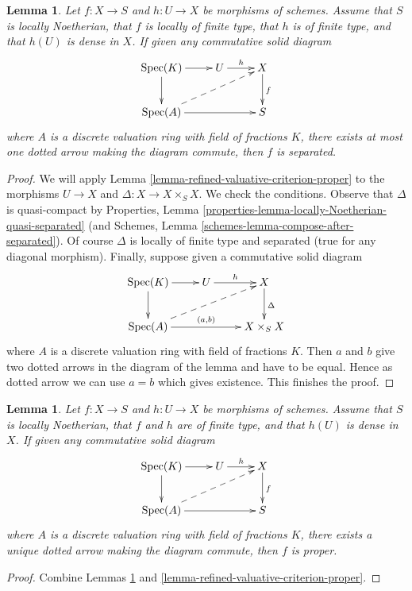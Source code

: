 \documentclass{stacks-project}
\theoremstyle{plain}
\newtheorem{lemma}[subsection]{Lemma}
\theoremstyle{definition}
\theoremstyle{remark}
\numberwithin{equation}{subsection}
\def\Spec{\mathop{\mathrm{Spec}}}
\begin{document}
\begin{lemma}
\label{lemma-refined-valuative-criterion-separated}
Let $f : X \to S$ and $h : U \to X$ be morphisms of schemes.
Assume that $S$ is locally Noetherian, that $f$ is locally of finite type,
that $h$ is of finite type, and that $h(U)$ is dense in $X$.
If given any commutative solid diagram
$$
\xymatrix{
\Spec(K) \ar[r] \ar[d] & U \ar[r]^h & X \ar[d]^f \\
\Spec(A) \ar[rr] \ar@{-->}[rru] & & S
}
$$
where $A$ is a discrete valuation ring with field of fractions $K$, there
exists at most one dotted arrow making the diagram commute, then $f$ is
separated.
\end{lemma}

\begin{proof}
We will apply Lemma \ref{lemma-refined-valuative-criterion-proper}
to the morphisms $U \to X$ and $\Delta : X \to X \times_S X$.
We check the conditions. Observe that $\Delta$ is quasi-compact by
Properties, Lemma \ref{properties-lemma-locally-Noetherian-quasi-separated}
(and Schemes, Lemma \ref{schemes-lemma-compose-after-separated}).
Of course $\Delta$ is locally of finite type and separated (true
for any diagonal morphism).
Finally, suppose given a commutative solid diagram
$$
\xymatrix{
\Spec(K) \ar[r] \ar[d] & U \ar[r]^h & X \ar[d]^\Delta \\
\Spec(A) \ar[rr]^{(a, b)} \ar@{-->}[rru] & & X \times_S X
}
$$
where $A$ is a discrete valuation ring with field of fractions $K$.
Then $a$ and $b$ give two dotted arrows in the diagram of the lemma
and have to be equal. Hence as dotted arrow we can use $a = b$
which gives existence. This finishes the proof.
\end{proof}

\begin{lemma}
\label{lemma-refined-valuative-criterion-universally-closed}
Let $f : X \to S$ and $h : U \to X$ be morphisms of schemes.
Assume that $S$ is locally Noetherian, that $f$ and $h$ are of finite type, and
that $h(U)$ is dense in $X$. If given any commutative solid diagram
$$
\xymatrix{
\Spec(K) \ar[r] \ar[d] & U \ar[r]^h & X \ar[d]^f \\
\Spec(A) \ar[rr] \ar@{-->}[rru] & & S
}
$$
where $A$ is a discrete valuation ring with field of fractions $K$, there
exists a unique dotted arrow making the diagram commute, then $f$ is proper.
\end{lemma}

\begin{proof}
Combine Lemmas \ref{lemma-refined-valuative-criterion-separated} and
\ref{lemma-refined-valuative-criterion-proper}.
\end{proof}
\end{document}
